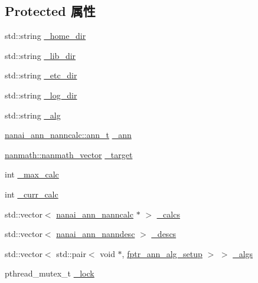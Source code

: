 \subsection*{Protected 属性}
\begin{DoxyCompactItemize}
\item 
std\+::string \hyperlink{classnanai_1_1nanai__ann__nannmgr_a8305b13f05cfd2ec029dc325f0921609}{\+\_\+home\+\_\+dir}
\item 
std\+::string \hyperlink{classnanai_1_1nanai__ann__nannmgr_ac074b69306e1ff1a381fbcde3d66d75c}{\+\_\+lib\+\_\+dir}
\item 
std\+::string \hyperlink{classnanai_1_1nanai__ann__nannmgr_a0da1bf8be2e30b97f5414dbba84a9e4c}{\+\_\+etc\+\_\+dir}
\item 
std\+::string \hyperlink{classnanai_1_1nanai__ann__nannmgr_a7d3908d8d93cc40191ec8f20f4808ba0}{\+\_\+log\+\_\+dir}
\item 
std\+::string \hyperlink{classnanai_1_1nanai__ann__nannmgr_a3a14b96819511b38e30bd9857dd86b14}{\+\_\+alg}
\item 
\hyperlink{classnanai_1_1nanai__ann__nanncalc_1_1ann__t}{nanai\+\_\+ann\+\_\+nanncalc\+::ann\+\_\+t} \hyperlink{classnanai_1_1nanai__ann__nannmgr_aa808696e65d0f030afe6e2de2b7d3e6d}{\+\_\+ann}
\item 
\hyperlink{classnanmath_1_1nanmath__vector}{nanmath\+::nanmath\+\_\+vector} \hyperlink{classnanai_1_1nanai__ann__nannmgr_a384127c4c4058bc4b28bdf928d59588a}{\+\_\+target}
\item 
int \hyperlink{classnanai_1_1nanai__ann__nannmgr_a7133133957796b1b5b75e8d761b54866}{\+\_\+max\+\_\+calc}
\item 
int \hyperlink{classnanai_1_1nanai__ann__nannmgr_a8531ad0d6391af0c318f286b44fd0604}{\+\_\+curr\+\_\+calc}
\item 
std\+::vector$<$ \hyperlink{classnanai_1_1nanai__ann__nanncalc}{nanai\+\_\+ann\+\_\+nanncalc} $\ast$ $>$ \hyperlink{classnanai_1_1nanai__ann__nannmgr_a25dc5374ad7545e1c6255afb647264a9}{\+\_\+calcs}
\item 
std\+::vector$<$ \hyperlink{namespacenanai_a892a8c80381d0005a076b68fbbf2d918}{nanai\+\_\+ann\+\_\+nanndesc} $>$ \hyperlink{classnanai_1_1nanai__ann__nannmgr_a4ffd16017f8b8a0aa6dbd0c3210c13d2}{\+\_\+descs}
\item 
std\+::vector$<$ std\+::pair$<$ void $\ast$, \hyperlink{namespacenanai_af358544d3d83ecb56361b1eaa46a0e98}{fptr\+\_\+ann\+\_\+alg\+\_\+setup} $>$ $>$ \hyperlink{classnanai_1_1nanai__ann__nannmgr_a3402ccfa83590793eb0755110e4a023e}{\+\_\+algs}
\item 
pthread\+\_\+mutex\+\_\+t \hyperlink{classnanai_1_1nanai__ann__nannmgr_a9c4963abd61f8aa52b372c01062b5b4d}{\+\_\+lock}
\end{DoxyCompactItemize}


